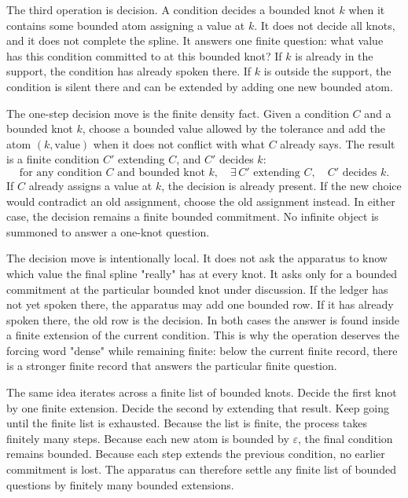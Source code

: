 The third operation is decision. A condition decides a bounded knot \(k\) when
it contains some bounded atom assigning a value at \(k\). It does not decide
all knots, and it does not complete the spline. It answers one finite question:
what value has this condition committed to at this bounded knot? If \(k\) is
already in the support, the condition has already spoken there. If \(k\) is
outside the support, the condition is silent there and can be extended by adding
one new bounded atom.

The one-step decision move is the finite density fact. Given a condition \(C\)
and a bounded knot \(k\), choose a bounded value allowed by the tolerance and
add the atom \((k,\mathrm{value})\) when it does not conflict with what \(C\)
already says. The result is a finite condition \(C'\) extending \(C\), and
\(C'\) decides \(k\):
\[
  \text{for any condition } C \text{ and bounded knot } k,
  \quad
  \exists\, C' \text{ extending } C,\quad C' \text{ decides } k.
\]
If \(C\) already assigns a value at \(k\), the decision is already present. If
the new choice would contradict an old assignment, choose the old assignment
instead. In either case, the decision remains a finite bounded commitment. No
infinite object is summoned to answer a one-knot question.

The decision move is intentionally local. It does not ask the apparatus to know
which value the final spline "really" has at every knot. It asks only for a
bounded commitment at the particular bounded knot under discussion. If the
ledger has not yet spoken there, the apparatus may add one bounded row. If it
has already spoken there, the old row is the decision. In both cases the answer
is found inside a finite extension of the current condition. This is why the
operation deserves the forcing word "dense" while remaining finite: below the
current finite record, there is a stronger finite record that answers the
particular finite question.

The same idea iterates across a finite list of bounded knots. Decide the first
knot by one finite extension. Decide the second by extending that result. Keep
going until the finite list is exhausted. Because the list is finite, the
process takes finitely many steps. Because each new atom is bounded by
\(\varepsilon\), the final condition remains bounded. Because each step
extends the previous condition, no earlier commitment is lost. The apparatus
can therefore settle any finite list of bounded questions by finitely many
bounded extensions.

